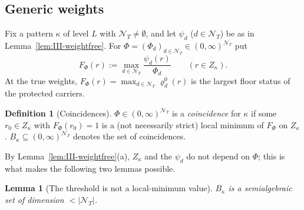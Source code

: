 \documentclass[10pt]{amsart}
\newtheorem{lemma}[theorem]{Lemma}
\theoremstyle{definition}
\newtheorem{definition}[theorem]{Definition}
\theoremstyle{remark}
\begin{document}
\subsection{Generic weights}\label{subsec:III-NLMGEN}

Fix a pattern $\kappa$ of level $L$ with $\mathcal N_T\ne\emptyset$, and let
$\psi_d$ ($d\in\mathcal N_T$) be as in Lemma~\ref{lem:III-weightfree}.  For
$\Phi=(\Phi_d)_{d\in\mathcal N_T}\in(0,\infty)^{\mathcal N_T}$ put
\[
 F_\Phi(r):=\max_{d\in\mathcal N_T}\frac{\psi_d(r)}{\Phi_d}\qquad(r\in
 Z_\kappa).
\]
At the true weights, $F_\Phi(r)=\max_{d\in\mathcal N_T}\varrho^0_d(r)$ is the
largest floor status of the protected carriers.

\begin{definition}[Coincidences]\label{def:III-coinc}
$\Phi\in(0,\infty)^{\mathcal N_T}$ is a \emph{coincidence} for $\kappa$ if some
$r_0\in Z_\kappa$ with $F_\Phi(r_0)=1$ is a (not necessarily strict) local
minimum of $F_\Phi$ on $Z_\kappa$.  $B_\kappa\subseteq(0,\infty)^{\mathcal N_T}$
denotes the set of coincidences.
\end{definition}

By Lemma~\ref{lem:III-weightfree}(a), $Z_\kappa$ and the $\psi_d$ do not depend
on $\Phi$; this is what makes the following two lemmas possible.

\begin{lemma}[The threshold is not a local-minimum value]\label{lem:III-NLM}
$B_\kappa$ is a semialgebraic set of dimension $<|\mathcal N_T|$.
\end{lemma}
\end{document}
